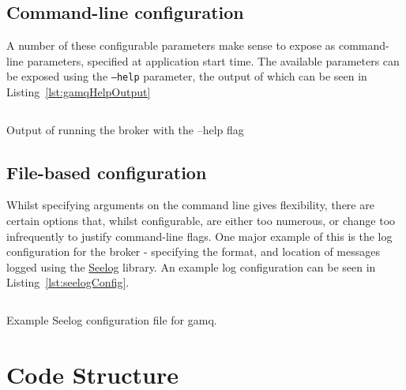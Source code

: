 \subsection{Command-line configuration}
\label{sub:Command-line configuration}

A number of these configurable parameters make sense to expose as command-line
parameters, specified at application start time. The available parameters can be
exposed using the \texttt{--help} parameter, the output of which can be seen in
Listing~\ref{lst:gamqHelpOutput}

\begin{listing}[ht]
  \centering
  \inputminted{bash}{code/gamqHelpOutput}
  \caption{Output of running the broker with the --help flag}
  \label{lst:gamqHelpOutput}
\end{listing}

\subsection{File-based configuration}
\label{sub:File-based configuration}

Whilst specifying arguments on the command line gives flexibility, there are
certain options that, whilst configurable, are either too numerous, or change
too infrequently to justify command-line flags. One major example of this is the
log configuration for the broker - specifying the format, and location of
messages logged using the \href{https://github.com/cihub/seelog}{Seelog}
library. An example log configuration can be seen in
Listing~\ref{lst:seelogConfig}.

\begin{listing}[ht]
  \centering
  \inputminted{xml}{code/gamq/config/logconfig.xml}
  \caption{Example Seelog configuration file for gamq.}
  \label{lst:seelogConfig}
\end{listing}

\section{Code Structure}
\label{sec:codestructure}

